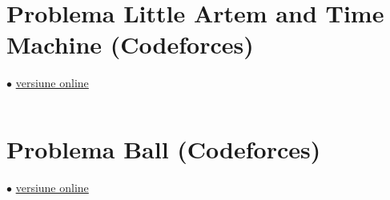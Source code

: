 \documentclass[../main.tex]{subfiles}
\begin{document}
\inputminted{cpp}{../src/fenwick-trees/mboard.cpp}

\section{Problema Little Artem and Time Machine (Codeforces)}
\label{code:little-artem-and-time-machine}
$\bullet$
\href{https://codeforces.com/contest/669/submission/342908294}{versiune online}

\inputminted{cpp}{../src/fenwick-trees/little-artem-and-time-machine.cpp}

\section{Problema Ball (Codeforces)}
\label{code:ball}
$\bullet$
\href{https://codeforces.com/contest/12/submission/392831009}{versiune online}

\inputminted{cpp}{../src/fenwick-trees/ball.cpp}
\end{document}
